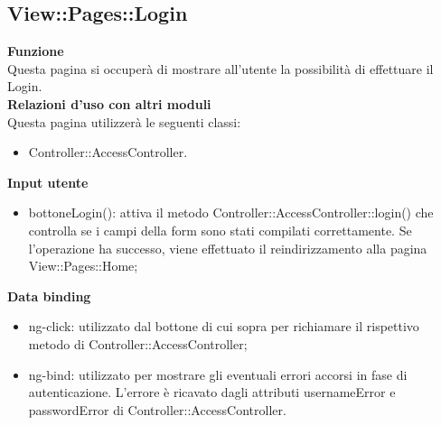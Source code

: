 {\subsection{View::Pages::Login}{
	\textbf{Funzione}\\
		\indent Questa pagina si occuperà di mostrare all'utente la possibilità di effettuare il Login.\\
	\textbf{Relazioni d'uso con altri moduli}\\
		\indent Questa pagina utilizzerà le seguenti classi:
	\begin{itemize}
		\item Controller::AccessController.
	\end{itemize}
	\textbf{Input utente}
		\begin{itemize}
		\item bottoneLogin(): attiva il metodo Controller::AccessController::login() che controlla se i campi della form sono stati compilati correttamente. Se l'operazione ha successo, viene effettuato il reindirizzamento alla pagina View::Pages::Home;
	\end{itemize}
	\textbf{Data binding}
	\begin{itemize}
		\item ng-click: utilizzato dal bottone di cui sopra per richiamare il rispettivo metodo di Controller::AccessController;
		\item ng-bind: utilizzato per mostrare gli eventuali errori accorsi in fase di autenticazione. L'errore è ricavato dagli attributi usernameError e passwordError di Controller::\-AccessController.
	\end{itemize}
	}
}
